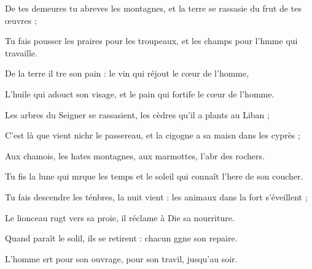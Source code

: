 \item De tes demeures tu abreves les montagnes,\psstar{} et la terre se rassasie du frut de tes œuvres ;
\item Tu fais pousser les praires pour les troupeaux,\psstar{} et les champs pour l’hmme qui travaille. 
\item De la terre il tre son pain :\psstar{} le vin qui réjout le cœur de l’homme, 
\item L’huile qui adouct son visage,\psstar{} et le pain qui fortife le cœur de l’homme.
\item Les arbres du Seigner se rassasient,\psstar{} les cèdres qu’il a plants au Liban ;
\item C’est là que vient nichr le passereau,\psstar{} et la cigogne a sa maisn dans les cyprès ;
\item Aux chamois, les hates montagnes,\psstar{} aux marmottes, l’abr des rochers.
\item Tu fis la lune qui mrque les temps\psstar{} et le soleil qui connaît l’here de son coucher.
\item Tu fais descendre les ténbres, la nuit vient :\psstar{} les animaux dans la fort s’éveillent ;
\item Le lionceau rugt vers sa proie,\psstar{} il réclame à Die sa nourriture.
\item Quand paraît le solil, ils se retirent :\psstar{} chacun ggne son repaire.
\item L’homme srt pour son ouvrage,\psstar{} pour son travil, jusqu’au soir.